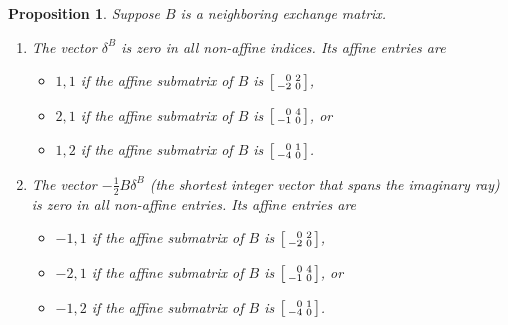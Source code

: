 \documentclass{amsart}
\newtheorem{proposition}{Proposition}[section]
\theoremstyle{definition}
\theoremstyle{remark}
\numberwithin{equation}{section}
\newcommand{\0}{{\mathbf{0}}}
\begin{document}
\begin{proposition}\label{neigh good stuff}
Suppose $B$ is a neighboring exchange matrix.
\begin{enumerate}[label=\bf\arabic*., ref=\arabic*]
\item\label{neigh delta}
The vector $\delta^B$ is zero in all non-affine indices.
Its affine entries are
\begin{itemize}
\item
$1,1$ if the affine submatrix of $B$ is $\begin{bsmallmatrix*}[r]0&2\\-2&0\end{bsmallmatrix*}$,
\item
$2,1$ if the affine submatrix of $B$ is $\begin{bsmallmatrix*}[r]0&4\\-1&0\end{bsmallmatrix*}$, or
\item
$1,2$ if the affine submatrix of $B$ is $\begin{bsmallmatrix*}[r]0&1\\-4&0\end{bsmallmatrix*}$.
\end{itemize}
\item\label{neigh im ray}
The vector $-\frac12B\delta^B$ (the shortest integer vector that spans the imaginary ray) is zero in all non-affine entries.
Its affine entries are
\begin{itemize}
\item
$-1,1$ if the affine submatrix of $B$ is $\begin{bsmallmatrix*}[r]0&2\\-2&0\end{bsmallmatrix*}$,
\item
$-2,1$ if the affine submatrix of $B$ is $\begin{bsmallmatrix*}[r]0&4\\-1&0\end{bsmallmatrix*}$, or
\item
$-1,2$ if the affine submatrix of $B$ is $\begin{bsmallmatrix*}[r]0&1\\-4&0\end{bsmallmatrix*}$.
\end{itemize}
\end{enumerate}
\end{proposition}
\end{document}
